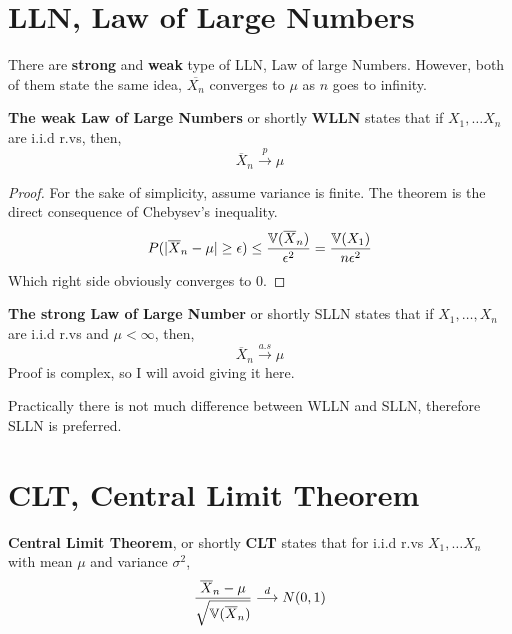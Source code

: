 \section{LLN, Law of Large Numbers}
There are \textbf{strong} and \textbf{weak} type of LLN, Law of large Numbers. However, both of them state the same idea, $\overline{X_n}$ converges to $\mu$ as  $n$ goes to infinity.
\begin{theorem}
    \textbf{The weak Law of Large Numbers} or shortly \textbf{WLLN} states that if $X_1, \ldots X_n$ are i.i.d r.vs, then,
    \[ \overline{X}_n \stackrel{p}{\longrightarrow} \mu\]
    \begin{proof}
        For the sake of simplicity, assume variance is finite.
        The theorem is the direct consequence of  Chebysev's inequality.
        \[ P( |\overline{X}_n - \mu| \ge \epsilon) \le \frac{{\mathbb{V}}(\overline{X}_n)}{\epsilon^2} = \frac{{\mathbb{V}}(X_1)}{n\epsilon^2}\]
    Which right side obviously converges to $0$.
    \end{proof}
\end{theorem}
\begin{theorem}
    \textbf{The strong Law of Large Number} or shortly SLLN states that if $X_1, \ldots,X_n$ are i.i.d r.vs and $\mu < \infty$, then,
    \[ \overline{X}_n \stackrel{a.s}{\longrightarrow} \mu \]
    Proof is complex, so I will avoid giving it here.
\end{theorem}
Practically there is not much difference between WLLN and SLLN, therefore SLLN is preferred.
\section{CLT, Central Limit Theorem}
\begin{theorem}
    \textbf{Central Limit Theorem}, or shortly \textbf{CLT} states that for i.i.d r.vs $X_1, \ldots X_n$ with mean $\mu$ and variance $\sigma^2$,
    \[ \frac{\overline{X}_n - \mu}{\sqrt{{\mathbb{V}} ( \overline{X}_n)}} \stackrel{d}{\longrightarrow} N(0,1)\]
\end{theorem}


